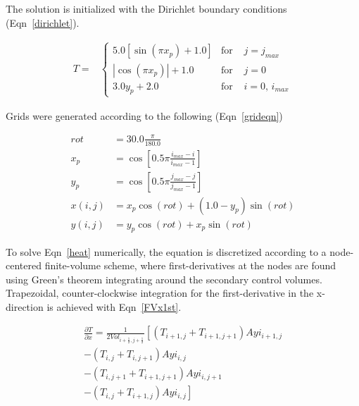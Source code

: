 \documentclass[twocolumn,10pt]{asme2ej}
\begin{document}
\noindent The solution is initialized with the Dirichlet boundary conditions (Eqn~\ref{dirichlet}).

\begin{equation}
\begin{split}
T = &\left\{ \begin{array}{lll}
    \mbox{$5.0 \left[ \sin\left( \pi x_p \right) + 1.0 \right]$} & \mbox{for } &j = j_{max} \\
    \mbox{$\left| \cos\left( \pi x_p \right)\right|+1.0$} & \mbox{for } &j = 0 \\
    \mbox{$3.0 y_p + 2.0$} & \mbox{for } &i = 0, \, i_{max}
     \end{array} \right.
\end{split}
\label{dirichlet}
\end{equation}

\noindent Grids were generated according to the following (Eqn~\ref{grideqn})

\begin{equation}
\begin{split}
   rot &= 30.0 \frac{\pi}{180.0} \\
   x_p &= \cos \left[ 0.5\pi \frac{i_{max}-i}{i_{max}-1} \right] \\
   y_p &= \cos \left[ 0.5\pi \frac{j_{max}-j}{j_{max}-1} \right] \\
x(i,j) &= x_p \cos(rot) + (1.0 - y_p) \sin(rot) \\
y(i,j) &= y_p \cos(rot) + x_p \sin(rot)
\end{split}
\label{grideqn}
\end{equation}

\noindent To solve Eqn~\ref{heat} numerically, the equation is discretized according to a node-centered finite-volume scheme, where first-derivatives at the nodes are found using Green's theorem integrating around the secondary control volumes.  Trapezoidal, counter-clockwise integration for the first-derivative in the x-direction is achieved with Eqn~\ref{FVx1st}.

\begin{equation}
\begin{split}
\frac{\partial T}{\partial x} = \frac{1}{2Vol_{i+\frac{1}{2},j+\frac{1}{2}}}
    \left[ \left(T_{i+1,j} + T_{i+1,j+1} \right)Ayi_{i+1,j} \right. \\
    \left. - \left(T_{i,j} + T_{i,j+1} \right)Ayi_{i,j} \right. \\
    \left. - \left(T_{i,j+1} + T_{i+1,j+1} \right)Ayi_{i,j+1} \right. \\
    \left. - \left(T_{i,j} + T_{i+1,j} \right)Ayi_{i,j} \right]
\end{split}
\label{FVx1st}
\end{equation}
\end{document}
